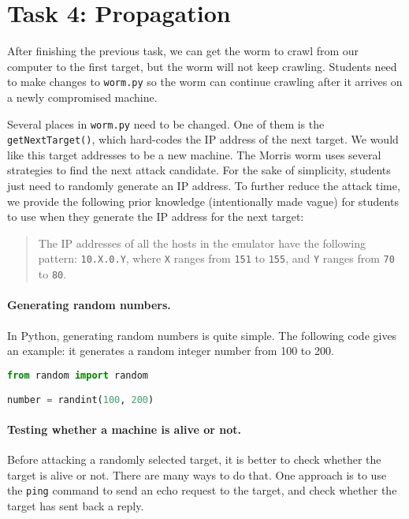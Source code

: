 \section{Task 4: Propagation} 


After finishing the previous task, we can get the worm to
crawl from our computer to the first target, but 
the worm will not keep crawling. Students need to make changes
to \texttt{worm.py} so the worm can continue crawling after
it arrives on a newly compromised machine. 

Several places in \texttt{worm.py} need to be changed.
One of them is the \texttt{getNextTarget()}, 
which hard-codes the IP address of the next target. 
We would like this target addresses to be a new machine. 
The Morris worm uses several strategies to find the next 
attack candidate. 
For the sake of simplicity,
students just need to randomly generate an IP address. 
To further reduce the attack time, we provide the 
following prior knowledge (intentionally made vague)
for students to use when
they generate the IP address for the next target:

\begin{quote}
    The IP addresses of all the hosts in the emulator have the following
    pattern: \texttt{10.X.0.Y}, where \texttt{X} ranges from 
    \texttt{151} to \texttt{155}, 
    and \texttt{Y} ranges from \texttt{70} to \texttt{80}.  
\end{quote}
 
\paragraph{Generating random numbers.}
In Python, generating random numbers is quite simple.
The following code gives an example: it generates a random 
integer number from 100 to 200.

\begin{lstlisting}[language=Python]
from random import random

number = randint(100, 200)
\end{lstlisting}
 

\paragraph{Testing whether a machine is alive or not.}
Before attacking a randomly selected target, it is better
to check whether the target is alive or not. 
There are many ways to do that. 
One approach is to use the \texttt{ping} command to send 
an echo request to the target, and check
whether the target has sent back a reply.

